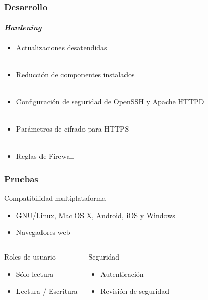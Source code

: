 \documentclass{beamer}
\begin{document}

\begin{frame}
\frametitle{Desarrollo}
\framesubtitle{\textsl{Hardening}}
\justifying
\begin{itemize}
 \item Actualizaciones desatendidas
\\~\\
 \item Reducci\'{o}n de componentes instalados
\\~\\
 \item Configuraci\'{o}n de seguridad de \textup{OpenSSH} y Apache \textup{HTTPD}
\\~\\
 \item Par\'{a}metros de cifrado para \textup{HTTPS}
\\~\\
 \item Reglas de Firewall
\end{itemize}

\end{frame}


\begin{frame}
\frametitle{Pruebas}
\justifying

\begin{block}{Compatibilidad multiplataforma}
 \begin{itemize}
  \item GNU/Linux, Mac OS X, Android, iOS y Windows
  \item Navegadores web
 \end{itemize}
\end{block}

\begin{columns}[c] 

\begin{block}{Roles de usuario}
 \begin{itemize}
  \item S\'{o}lo lectura
  \item Lectura / Escritura
 \end{itemize}
\end{block}

\begin{block}{Seguridad}
 \begin{itemize}
  \item Autenticaci\'{o}n
  \item Revisi\'{o}n de seguridad
 \end{itemize}
\end{block}

\end{columns}

\end{frame}
\end{document}
